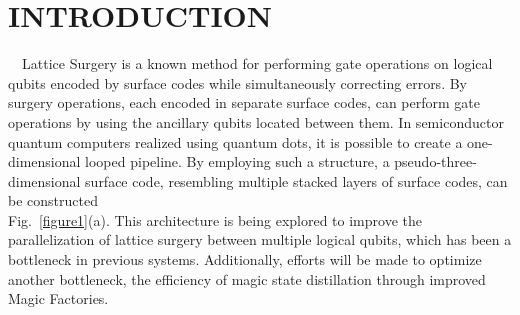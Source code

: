 

\frenchspacing
{}
  \section{INTRODUCTION}
  \vspace{-8pt}
  \ \ Lattice Surgery\textsuperscript{\cite{horsman2012}} is a known method for performing gate operations on logical qubits encoded by surface codes while simultaneously correcting errors. By surgery operations, each encoded in separate surface codes, can perform gate operations by using the ancillary qubits located between them. In semiconductor quantum computers realized using quantum dots, it is possible to create a one-dimensional looped pipeline\textsuperscript{\cite{cai2023}}. By employing such a structure, a pseudo-three-dimensional surface code, resembling multiple stacked layers of surface codes, can be constructed \\Fig.\ \ref{figure1}(a). This architecture is being explored to improve the parallelization of lattice surgery between multiple logical qubits, which has been a bottleneck in previous systems. Additionally, efforts will be made to optimize another bottleneck, the efficiency of magic state distillation\textsuperscript{\cite{litinski2019game}\cite{litinski2019magic}} through improved Magic Factories.

